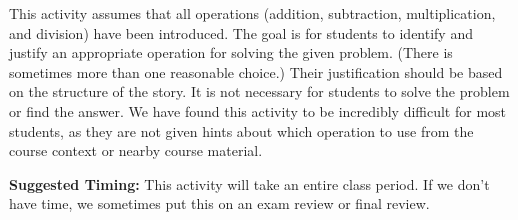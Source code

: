 \documentclass[handout]{ximera}
\begin{document}
\newpage
\begin{instructorNotes}
This activity assumes that all operations (addition, subtraction, multiplication, and division) have been introduced.  The goal is for students to identify and justify an appropriate operation for solving the given problem. (There is sometimes more than one reasonable choice.) Their justification should be based on the structure of the story. It is not necessary for students to solve the problem or find the answer.  We have found this activity to be incredibly difficult for most students, as they are not given hints about which operation to use from the course context or nearby course material.

{\bf Suggested Timing:} This activity will take an entire class period.  If we don't have time, we sometimes put this on an exam review or final review.
\end{instructorNotes}
\end{document}

